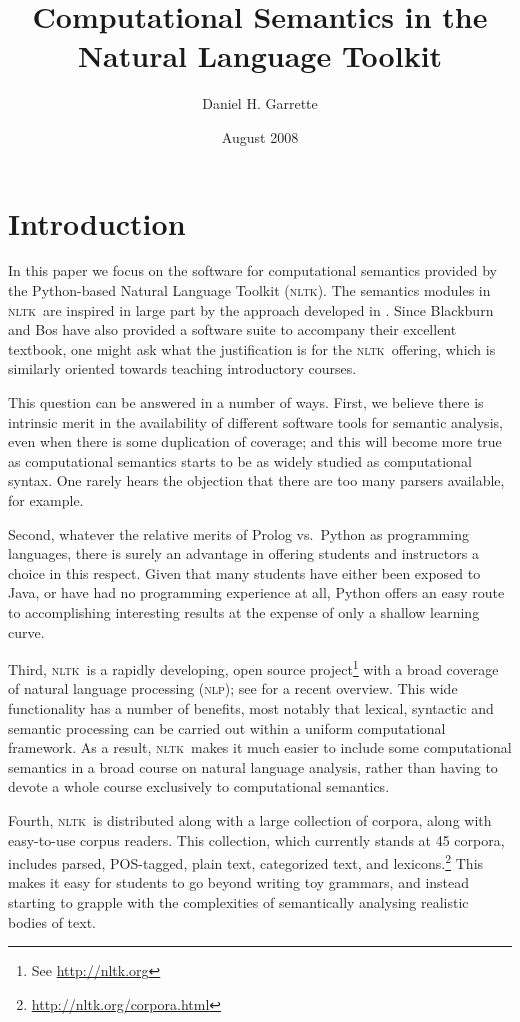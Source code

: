\documentclass[11pt]{article}
\newcommand{\NLP}{\textsc{nlp}}
\newcommand{\NLTK}{\textsc{nltk}}
\begin{document}
\title{Computational Semantics in the Natural Language Toolkit}
\author{Daniel H. Garrette}
\date{August 2008}
\maketitle

\section{Introduction}

In this paper we focus on the software for computational semantics provided
by the Python-based Natural Language Toolkit (\NLTK). The semantics
modules in \NLTK\ are
inspired in large part by the approach developed in \citet{BB}.
Since Blackburn and Bos have also provided a software suite to
accompany their excellent textbook, one might ask what the
justification is for the \NLTK\ offering, which is similarly oriented
towards teaching introductory courses.

This question can be answered in a number of ways. First, we believe
there is intrinsic merit in the availability of different
software tools for semantic analysis, even when there is some
duplication of coverage; and this will become more true as
computational semantics starts to be as widely studied as computational
syntax. One rarely hears the objection that there are too many
parsers available, for example. 

Second, whatever the relative merits of Prolog vs.\ Python as
programming languages, there is surely an advantage in offering
students and instructors a choice in this respect. Given that many
students have either been exposed to Java, or have had no programming
experience at all, Python offers an easy route to accomplishing
interesting results at the expense of only a shallow learning curve.

Third, \NLTK\ is a rapidly developing, open source
project\footnote{See \url{http://nltk.org}} with a broad coverage of
natural language processing (\NLP); see \citet{Multidisciplinary} for
a recent overview. This wide functionality has a number of benefits,
most notably that lexical, syntactic and semantic processing can be
carried out within a uniform computational framework. As a result,
\NLTK\ makes it much easier to include some computational semantics in
a broad course on natural language analysis, rather than having to
devote a whole course exclusively to computational semantics.

Fourth, \NLTK\ is distributed along with a
large collection of corpora, along with easy-to-use corpus readers.
This collection, which currently stands at 45 corpora, includes
parsed, POS-tagged, plain text, categorized text, and
lexicons.\footnote{\url{http://nltk.org/corpora.html}} This makes it
easy for students to go beyond writing toy grammars, and instead
starting to grapple with the complexities of semantically analysing
realistic bodies of text.
\end{document}
